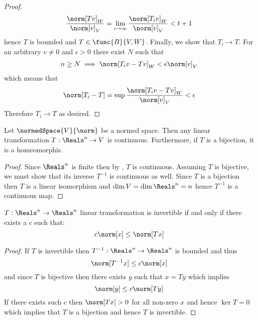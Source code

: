 \begin{proof}
    \begin{equation*}
        \dfrac{\norm[Tv]_W}{\norm[v]_V} = \lim_{i \to \infty}  \dfrac{\norm[T_i v]_W}{\norm[v]_V} < t + 1
    \end{equation*}
    hence \(T\) is bounded and \(T \in \func{B}{V,W}\). Finally, we show that \(T_i \to T\). For an arbitrary \(v \neq 0\) and \(\epsilon > 0\) there exist \(N\) such that
    \begin{align*}
        n \geq N \implies \norm[T_i v - Tv]_W < \epsilon \norm[v]_V
    \end{align*}
    which means that
    \begin{equation*}
        \norm[T_i - T] = \sup \dfrac{\norm[T_i v - Tv]_W}{\norm[v]_V} < \epsilon
    \end{equation*}
    Therefore \(T_i \to T\) as desired.
\end{proof}

\begin{theorem}
    Let \(\normedSpace{V}{\norm}\) be a normed space. Then any linear transformation \(T: \Reals^n \to V\) is continuous. Furthermore, if \(T\) is a bijection, it is a homeomorphis.
\end{theorem}

\begin{proof}
    Since \(\Reals^n\) is finite then by , \(T\) is continuous. Assuming \(T\) is bijective, we must show that its inverse \(T^{-1}\) is continuous as well. Since \(T\) is a bijection then \(T\) is a linear isomorphism and \(\dim V = \dim \Reals^n = n\) hence \(T^{-1}\) is a continuous map.
\end{proof}

\begin{theorem}
    \(T : \Reals^n \to \Reals^n\) linear transformation is invertible if and only if there exists a \(c\) such that:
    \begin{equation*}
        c \norm[x] \leq \norm[Tx]
    \end{equation*}
\end{theorem}

\begin{proof}
    If \(T\) is invertible then \(T^{-1} : \Reals^n \to \Reals^n \) is bounded and thus
    \begin{equation*}
        \norm[T^{-1}x] \leq c \norm[x]
    \end{equation*}
    and since \(T\) is bijective then there exists \(y\) such that \(x = Ty\) which implies
    \begin{equation*}
        \norm[y] \leq c\norm[Ty]
    \end{equation*}
    If there exists such \(c\) then \(\norm[Tx] > 0\) for all non-zero \(x\) and hence \(\ker T  = 0\) which implies that \(T\) is a bijection and hence \(T\) is invertible.
\end{proof}

